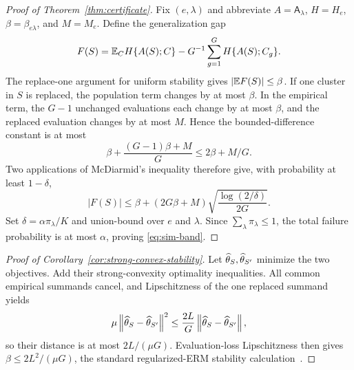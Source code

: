 \begin{proof}[Proof of Theorem~\ref{thm:certificate}]
Fix \((e,\lambda)\) and abbreviate \(A=\mathsf A_\lambda\), \(H=H_e\), \(\beta=\beta_{e\lambda}\), and \(M=M_e\). Define the generalization gap
\[
F(S)=\mathbb E_C H\{A(S);C\}-G^{-1}\sum_{g=1}^G H\{A(S);C_g\}.
\]
The replace-one argument for uniform stability gives \(|\mathbb E F(S)|\le\beta\). If one cluster in \(S\) is replaced, the population term changes by at most \(\beta\). In the empirical term, the \(G-1\) unchanged evaluations each change by at most \(\beta\), and the replaced evaluation changes by at most \(M\). Hence the bounded-difference constant is at most
\[
\beta+\frac{(G-1)\beta+M}{G}\le2\beta+M/G.
\]
Two applications of McDiarmid's inequality therefore give, with probability at least \(1-\delta\),
\[
|F(S)|\le\beta+(2G\beta+M)
\sqrt{\frac{\log(2/\delta)}{2G}}.
\]
Set \(\delta=\alpha\pi_\lambda/K\) and union-bound over \(e\) and \(\lambda\). Since \(\sum_\lambda\pi_\lambda\le1\), the total failure probability is at most \(\alpha\), proving \cref{eq:sim-band}.
\end{proof}

\begin{proof}[Proof of Corollary~\ref{cor:strong-convex-stability}]
Let \(\widehat\theta_S,\widehat\theta_{S'}\) minimize the two objectives. Add their strong-convexity optimality inequalities. All common empirical summands cancel, and Lipschitzness of the one replaced summand yields
\[
\mu\left\lVert \widehat\theta_S-\widehat\theta_{S'}\right\rVert^2
\le\frac{2L}{G}\left\lVert \widehat\theta_S-\widehat\theta_{S'}\right\rVert,
\]
so their distance is at most \(2L/(\mu G)\). Evaluation-loss Lipschitzness then gives
\(\beta\le2L^2/(\mu G)\), the standard regularized-ERM stability calculation~\citep{bousquet2002stability}.
\end{proof}
